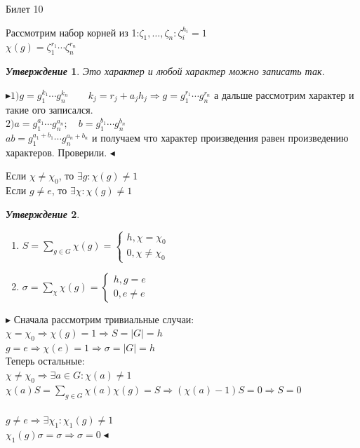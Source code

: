 \documentclass[a4paper,12pt]{article}
\newtheorem{utv}{\textit{Утверждение}}
\newcommand{\q}{\quad}
\newcommand{\pb}{\blacktriangleright}
\newcommand{\pe}{\blacktriangleleft}
\newcommand{\Ra}{\Rightarrow}
\newcommand{\SL}{\sum\limits}
\begin{document}
\newpage
\begin{mybox2}{{Билет 10}}
\begin{formbox}{}
Рассмотрим набор корней из 1:$\zeta_1,\dots,\zeta_n: \zeta_i^{h_i} = 1$\\
$\chi(g) = \zeta_1^{r_1}\cdots \zeta_n^{r_n}$


\begin{utv} Это характер и любой характер можно записать так.
\end{utv}
\end{formbox}
$\pb 1) g = g_1^{k_1}\cdots g_n^{k_n}\q\q k_j = r_j + a_jh_j\Ra g = g_1^{r_1}\cdots g_n^{r_n} $ а дальше рассмотрим характер и такие ого записался.\\
$2) a = g_1^{a_1}\cdots g_n^{a_n};\q b = g_1^{b_1}\cdots g_n^{b_n}$\\
$ab = g_1^{a_1 + b_1}\cdots g_n^{a_n + b_n}$ и получаем что характер произведения равен произведению характеров. Проверили. $\pe$

Если $\chi \not=\chi_0$, то $\exists g: \chi(g) \not=1$\\
Если $g\not=e$, то $\exists \chi: \chi(g)\not=1$

\begin{formbox}{}
\begin{utv}\q\\
\begin{enumerate}
\item $S = \SL_{g\in G}\chi(g) = \begin{cases}h, \chi = \chi_0\\ 0, \chi \not= \chi_0\end{cases}$
\item $\sigma = \SL_{\chi}\chi(g) = \begin{cases}h, g = e\\ 0, e \not= e\end{cases}$
\end{enumerate}
\end{utv}
\end{formbox}
$\pb$ Сначала рассмотрим тривиальные случаи:\\
$\chi = \chi_0\Ra\chi(g) = 1\Ra S = |G| = h$\\
$g = e\Ra \chi(e) = 1\Ra\sigma = |G| = h$\\
Теперь остальные:\\
$\chi \not=\chi_0 \Ra \exists a\in G: \chi(a)\not=1$\\
$\chi(a)S = \SL_{g\in G}\chi(a)\chi(g) = S\Ra (\chi(a) - 1) S = 0 \Ra S = 0$\\\q\\
$g\not=e\Ra\exists \chi_1:\chi_1(g)\not=1$\\
$\chi_1(g)\sigma = \sigma \Ra \sigma = 0 \pe$


\end{mybox2}
\end{document}
